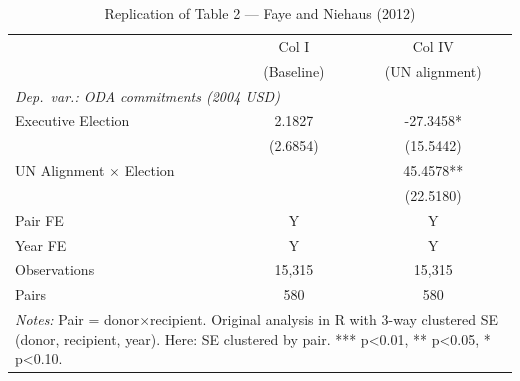 \begin{table}[htbp]
\centering
\caption{Replication of Table 2 --- Faye and Niehaus (2012)}
\label{tab:fayeniehaus_replication}
\begin{tabular}{lcc}
\toprule
 & Col I & Col IV \\
 & (Baseline) & (UN alignment) \\
\midrule
\multicolumn{3}{l}{\textit{Dep.\ var.: ODA commitments (2004 USD)}} \\
\addlinespace
Executive Election & 2.1827 & -27.3458* \\
 & (2.6854) & (15.5442) \\
\addlinespace
UN Alignment $\times$ Election & & 45.4578** \\
 & & (22.5180) \\
\addlinespace
Pair FE & Y & Y \\
Year FE & Y & Y \\
Observations & 15,315 & 15,315 \\
Pairs & 580 & 580 \\
\bottomrule
\multicolumn{3}{p{0.85\linewidth}}{\footnotesize
 \textit{Notes:} Pair = donor$\times$recipient. Original analysis
 in R with 3-way clustered SE (donor, recipient, year).
 Here: SE clustered by pair. *** p<0.01, ** p<0.05, * p<0.10.}
\end{tabular}
\end{table}
